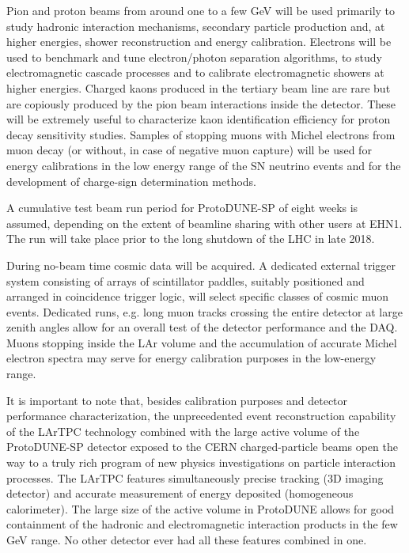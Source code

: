 Pion and proton beams from around one to a few GeV will be used primarily to study hadronic interaction mechanisms, secondary particle production and, at higher energies, shower reconstruction and energy calibration. Electrons will be used to benchmark and tune electron/photon separation algorithms, to study electromagnetic cascade processes and to calibrate electromagnetic showers at higher energies. Charged kaons produced in the tertiary beam line are rare but are copiously produced by the pion beam interactions inside the detector. These will be extremely useful to characterize kaon identification efficiency for proton decay sensitivity studies.  Samples of stopping muons with Michel electrons from muon decay (or without, in case of negative muon capture) will be used for energy calibrations in the low energy range of the SN neutrino events and for the development of charge-sign determination methods. 

A cumulative test beam run period for ProtoDUNE-SP of eight weeks is assumed, depending on the extent of beamline sharing with other users at EHN1. The run will take place prior to the long shutdown of the LHC in late 2018. 

During no-beam time cosmic data will be acquired. A dedicated external trigger system consisting of arrays of scintillator paddles, suitably positioned and arranged in coincidence trigger logic, will select specific classes of cosmic muon events. Dedicated runs, e.g. long muon tracks crossing the entire detector at large zenith angles allow for an overall test of the detector performance and the DAQ.
Muons stopping inside the LAr volume and the accumulation of accurate Michel electron spectra may serve for energy calibration purposes
in the low-energy range.

It is important to note that, besides calibration purposes and detector performance characterization, the unprecedented event reconstruction capability of the LArTPC technology combined with the large active volume of the ProtoDUNE-SP detector exposed to the CERN charged-particle beams open the way to a truly rich program of new physics investigations on particle interaction processes. 
  The LArTPC features simultaneously precise tracking (3D imaging detector) and accurate measurement of energy deposited (homogeneous calorimeter). The large size of the active volume in ProtoDUNE allows for good containment of the hadronic and electromagnetic interaction products in the few GeV range. No other detector ever had all these features combined in one. 
 
